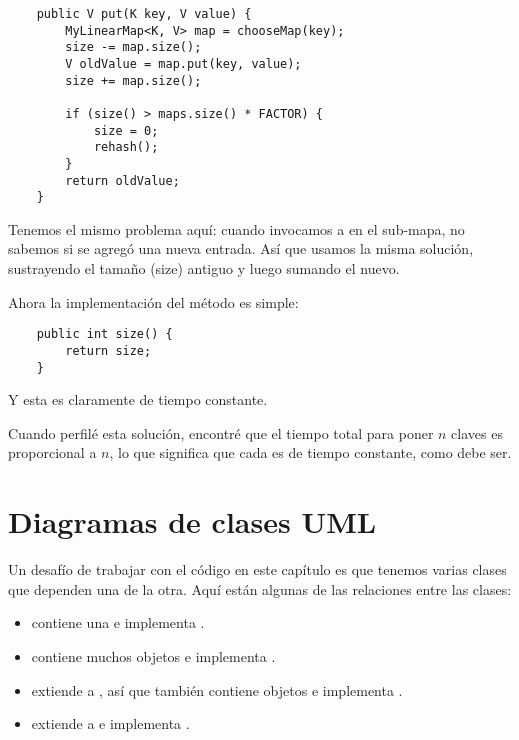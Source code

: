 \documentclass[12pt]{book}
\theoremstyle{exercise}
\begin{document}
\begin{verbatim}
    public V put(K key, V value) {
        MyLinearMap<K, V> map = chooseMap(key);
        size -= map.size();
        V oldValue = map.put(key, value);
        size += map.size();

        if (size() > maps.size() * FACTOR) {
            size = 0;
            rehash();
        }
        return oldValue;
    }
\end{verbatim}

Tenemos el mismo problema aquí: cuando invocamos a  en el
sub-mapa, no sabemos si se agregó una nueva entrada. Así que usamos la misma
solución, sustrayendo el tamaño (size) antiguo y luego sumando el nuevo.


Ahora la implementación del método  es simple:

\begin{verbatim}
    public int size() {
        return size;
    }
\end{verbatim}

Y esta es claramente de tiempo constante.


Cuando perfilé esta solución, encontré que el tiempo total para poner
$n$ claves es proporcional a $n$, lo que significa que cada  es
de tiempo constante, como debe ser.



\section{Diagramas de clases UML}
\label{uml-class-diagrams}


Un desafío de trabajar con el código en este capítulo es que tenemos
varias clases que dependen una de la otra. Aquí están algunas de las
relaciones entre las clases:

\begin{itemize}

\item
   contiene una  e implementa
  .
\item
   contiene muchos objetos  e
  implementa .
\item
   extiende a , así que también contiene
  objetos  e implementa .
\item
   extiende a  e
  implementa .
\end{itemize}
\end{document}
